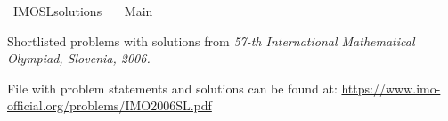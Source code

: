 %
\begin{isabellebody}%
%
%
\isadelimdocument
%
\endisadelimdocument
%
\isatagdocument
%
\isamarkuptrue%
%
\endisatagdocument
{\isafolddocument}%
%
\isadelimdocument
%
\endisadelimdocument
%
\isadelimtheory
%
\endisadelimtheory
%
\isatagtheory
{}\isamarkupfalse%
\ IMO{\isacharunderscore}{}{}{}{}{\isacharunderscore}SL{\isacharunderscore}solutions\isanewline
\ \ \ Main\isanewline
\isanewline
{}%
\endisatagtheory
{\isafoldtheory}%
%
\isadelimtheory
%
\endisadelimtheory
%
\begin{isamarkuptext}%
Shortlisted problems with solutions from \emph{57-th International Mathematical Olympiad, Slovenia, 2006.}

File with problem statements and solutions can be found at:
\url{https://www.imo-official.org/problems/IMO2006SL.pdf}%
\end{isamarkuptext}\isamarkuptrue%
%
\isadelimtheory
%
\endisadelimtheory
%
\isatagtheory
{}\isamarkupfalse%
%
\endisatagtheory
{\isafoldtheory}%
%
\isadelimtheory
%
\endisadelimtheory
%
\end{isabellebody}%
\endinput

